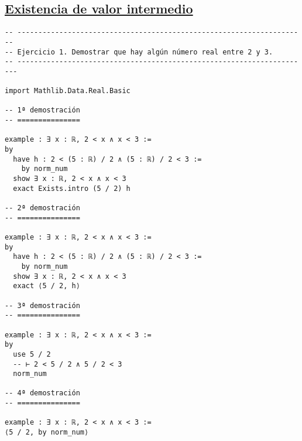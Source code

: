 \subsection{\href{./src/Logica/Existencia\_de\_valor\_intermedio.lean}{Existencia de valor intermedio}}
\label{sec:org9cec3af}
\begin{verbatim}
-- ---------------------------------------------------------------------
-- Ejercicio 1. Demostrar que hay algún número real entre 2 y 3.
-- ----------------------------------------------------------------------

import Mathlib.Data.Real.Basic

-- 1ª demostración
-- ===============

example : ∃ x : ℝ, 2 < x ∧ x < 3 :=
by
  have h : 2 < (5 : ℝ) / 2 ∧ (5 : ℝ) / 2 < 3 :=
    by norm_num
  show ∃ x : ℝ, 2 < x ∧ x < 3
  exact Exists.intro (5 / 2) h

-- 2ª demostración
-- ===============

example : ∃ x : ℝ, 2 < x ∧ x < 3 :=
by
  have h : 2 < (5 : ℝ) / 2 ∧ (5 : ℝ) / 2 < 3 :=
    by norm_num
  show ∃ x : ℝ, 2 < x ∧ x < 3
  exact ⟨5 / 2, h⟩

-- 3ª demostración
-- ===============

example : ∃ x : ℝ, 2 < x ∧ x < 3 :=
by
  use 5 / 2
  -- ⊢ 2 < 5 / 2 ∧ 5 / 2 < 3
  norm_num

-- 4ª demostración
-- ===============

example : ∃ x : ℝ, 2 < x ∧ x < 3 :=
⟨5 / 2, by norm_num⟩
\end{verbatim}

